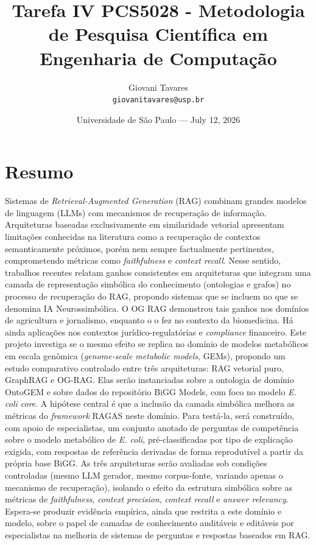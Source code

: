 \documentclass{article}
\title{Tarefa IV PCS5028 - Metodologia de Pesquisa Científica em Engenharia de Computação} %
\author{Giovani Tavares\\ \texttt{giovanitavares@usp.br}} %
\date{Universidade de São Paulo --- July 12, 2026} %
\begin{document}
\maketitle %






\section{Resumo}

Sistemas de \textit{Retrieval-Augmented Generation} (RAG) combinam grandes modelos de linguagem (LLMs) com mecanismos de recuperação de informação. Arquiteturas baseadas exclusivamente em similaridade vetorial apresentam limitações conhecidas na literatura como a recuperação de contextos semanticamente próximos, porém nem sempre factualmente pertinentes, comprometendo métricas como \textit{faithfulness} e \textit{context recall}.
Nesse sentido, trabalhos recentes relatam ganhos consistentes em arquiteturas que integram uma camada de representação simbólica do conhecimento (ontologias e grafos) no processo de recuperação do RAG, propondo sistemas que se incluem no que se denomina IA Neurossimbólica. O OG RAG \cite{sharma2025ograg} demonstrou tais ganhos nos domínios de agricultura e jornalismo, enquanto o \cite{feng2025ontologyrag} o fez no  contexto da biomedicina. Há ainda aplicações nos contextos jurídico-regulatórias e \textit{compliance} financeiro. Este projeto investiga se o mesmo efeito se replica no domínio de modelos metabólicos em escala genômica (\textit{genome-scale metabolic models}, GEMs), propondo um estudo comparativo controlado entre três arquiteturas: RAG vetorial puro, GraphRAG e OG-RAG. Elas serão instanciadas sobre a ontologia de domínio OntoGEM \cite{souza2025ontogem} e sobre dados do repositório BiGG Models, com foco no modelo \textit{E. coli core}. A hipótese central é que a inclusão da camada simbólica melhora as métricas do \textit{framework} RAGAS \cite{es-etal-2024-ragas} neste domínio. Para testá-la, será construído, com apoio de especialistas, um conjunto anotado de perguntas de competência sobre o modelo metabólico de \textit{E. coli}, pré-classificadas por tipo de explicação exigida, com respostas de referência derivadas de forma reprodutível a partir da própria base BiGG. As três arquiteturas serão avaliadas sob condições controladas (mesmo LLM gerador, mesmo corpus-fonte, variando apenas o mecanismo de recuperação), isolando o efeito da estrutura simbólica sobre as métricas de \textit{faithfulness}, \textit{context precision}, \textit{context recall} e \textit{answer relevancy}. Espera-se produzir evidência empírica, ainda que restrita a este domínio e modelo, sobre o papel de camadas de conhecimento auditáveis e editáveis por especialistas na melhoria de sistemas de perguntas e respostas baseados em RAG.
\end{document}
